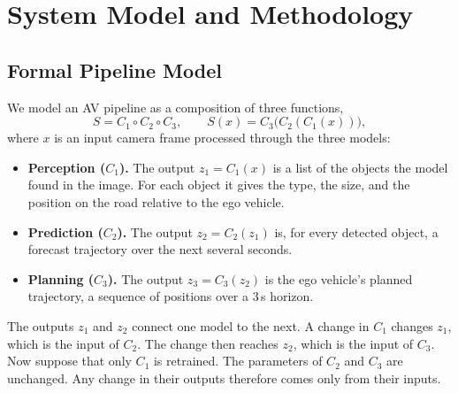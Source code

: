 \documentclass[conference]{IEEEtran}
\begin{document}
\section{System Model and Methodology}
\label{sec:method}

\subsection{Formal Pipeline Model}
We model an AV pipeline as a composition of three functions,
\begin{equation}
S = C_1 \circ C_2 \circ C_3,
\qquad
S(x) = C_3\bigl(C_2(C_1(x))\bigr),
\label{eq:comp}
\end{equation}
where $x$ is an input camera frame processed through the three models:
\begin{itemize}
\item \textbf{Perception ($C_1$).} The output $z_1 = C_1(x)$ is a list of the objects the model found in the image. For each object it gives the type, the size, and the position on the road relative to the ego vehicle.
\item \textbf{Prediction ($C_2$).} The output $z_2 = C_2(z_1)$ is, for every
detected object, a forecast trajectory over the next several seconds.
\item \textbf{Planning ($C_3$).} The output $z_3 = C_3(z_2)$ is the ego vehicle's
planned trajectory, a sequence of positions over a $3$\,s horizon.
\end{itemize}
The outputs $z_1$ and $z_2$ connect one model to the next. A change in $C_1$
changes $z_1$, which is the input of $C_2$. The change then reaches
$z_2$, which is the input of $C_3$. Now suppose that only $C_1$ is retrained. The
parameters of $C_2$ and $C_3$ are unchanged. Any change in their outputs
therefore comes only from their inputs.
\end{document}
